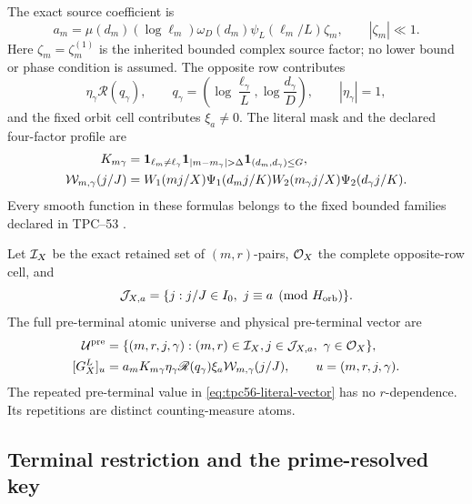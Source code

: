 The exact source coefficient is
\begin{equation}
 a_m
 =\mu(d_m)(\log\ell_m)\omega_D(d_m)
  \psi_L(\ell_m/L)\zeta_m,
 \qquad |\zeta_m|\ll1.
 \label{eq:tpc56-source-coefficient}
\end{equation}
Here \(\zeta_m=\zeta_m^{(1)}\) is the inherited bounded complex source
factor; no lower bound or phase condition is assumed.  The opposite row
contributes
\begin{equation}
 \eta_\gamma\mathscr R(q_\gamma),
 \qquad
 q_\gamma=
 \left(\log\frac{\ell_\gamma}{L},
       \log\frac{d_\gamma}{D}\right),
 \qquad |\eta_\gamma|=1,
 \label{eq:tpc56-opposite-profile}
\end{equation}
and the fixed orbit cell contributes \(\xi_a\ne0\).  The literal mask and
the declared four-factor profile are
\begin{align}
 K_{m\gamma}
 &=\one_{\ell_m\ne\ell_\gamma}
   \one_{|m-m_\gamma|>\Delta}
   \one_{(d_m,d_\gamma)\le G},
 \label{eq:tpc56-literal-mask}\\
 \cW_{m,\gamma}(j/J)
 &=W_1(mj/X)\Psi_1(d_mj/K)
   W_2(m_\gamma j/X)\Psi_2(d_\gamma j/K).
 \label{eq:tpc56-four-factor-profile}
\end{align}
Every smooth function in these formulas belongs to the fixed bounded
families declared in TPC--53 \citep{WangTPC53}.

Let \(\mathcal I_X\) be the exact retained set of \((m,r)\)-pairs,
\(\mathcal O_X\) the complete opposite-row cell, and
\begin{equation}
 \mathcal J_{X,a}
 =\{j:j/J\in I_0,\ j\equiv a\pmod {H_{\rm orb}}\}.
 \label{eq:tpc56-orbit-set}
\end{equation}
The full pre-terminal atomic universe and physical pre-terminal vector are
\begin{align}
 \mathcal U^{\rm pre}
 &=\{(m,r,j,\gamma):(m,r)\in\mathcal I_X,
      j\in\mathcal J_{X,a},\ \gamma\in\mathcal O_X\},
 \label{eq:tpc56-preterminal-universe}\\
 [G_X^L]_u
 &=a_mK_{m\gamma}\eta_\gamma\mathscr R(q_\gamma)\xi_a
   \mathcal W_{m,\gamma}(j/J),
 \qquad u=(m,r,j,\gamma).
 \label{eq:tpc56-literal-vector}
\end{align}
The repeated pre-terminal value in \eqref{eq:tpc56-literal-vector} has no
\(r\)-dependence.  Its repetitions are distinct counting-measure atoms.

\subsection{Terminal restriction and the prime-resolved key}

